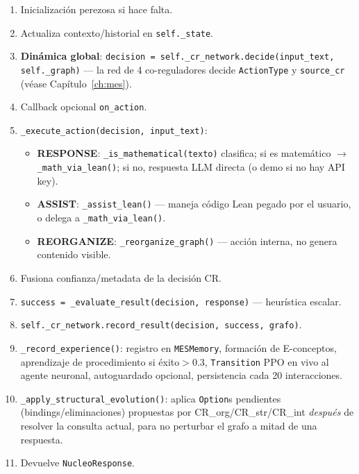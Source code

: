 \documentclass[11pt,a4paper]{report}
\newcommand{\code}[1]{\texttt{#1}}
\begin{document}
\begin{enumerate}
  \item Inicializaci\'on perezosa si hace falta.
  \item Actualiza contexto/historial en \code{self.\_state}.
  \item \textbf{Din\'amica global}: \code{decision = self.\_cr\_network.decide(input\_text, self.\_graph)} --- la red de 4 co-reguladores decide \code{ActionType} y \code{source\_cr} (v\'ease Cap\'itulo~\ref{ch:mes}).
  \item Callback opcional \code{on\_action}.
  \item \code{\_execute\_action(decision, input\_text)}:
    \begin{itemize}
      \item \textbf{RESPONSE}: \code{\_is_mathematical(texto)} clasifica; si es matem\'atico $\to$ \code{\_math_via_lean()}; si no, respuesta LLM directa (o demo si no hay API key).
      \item \textbf{ASSIST}: \code{\_assist_lean()} --- maneja c\'odigo Lean pegado por el usuario, o delega a \code{\_math_via_lean()}.
      \item \textbf{REORGANIZE}: \code{\_reorganize_graph()} --- acci\'on interna, no genera contenido visible.
    \end{itemize}
  \item Fusiona confianza/metadata de la decisi\'on CR.
  \item \code{success = \_evaluate_result(decision, response)} --- heur\'istica escalar.
  \item \code{self.\_cr\_network.record_result(decision, success, grafo)}.
  \item \code{\_record_experience()}: registro en \code{MESMemory}, formaci\'on de E-conceptos, aprendizaje de procedimiento si \'exito$>0.3$, \code{Transition} PPO en vivo al agente neuronal, autoguardado opcional, persistencia cada 20 interacciones.
  \item \code{\_apply_structural_evolution()}: aplica \code{Option}s pendientes (bindings/eliminaciones) propuestas por CR\_org/CR\_str/CR\_int \emph{despu\'es} de resolver la consulta actual, para no perturbar el grafo a mitad de una respuesta.
  \item Devuelve \code{NucleoResponse}.
\end{enumerate}
\end{document}
